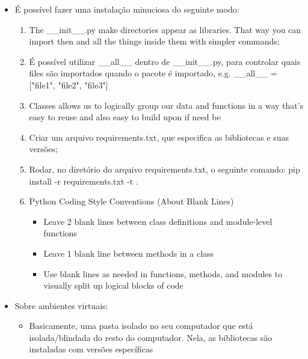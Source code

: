 \begin{itemize}
    \item É possível fazer uma instalação minuciosa do seguinte modo:
    
    \begin{enumerate}
        \item The \_\_init\_\_.py make directories appear as libraries. That way you can import then and all the things inside them with simpler commands; 
        
        \item É possível utilizar \_\_all\_\_ dentro de \_\_init\_\_.py, para controlar quais files são importados quando o pacote é importado, e.g. \_\_all\_\_ = ["file1", "file2", "file3"]
        
        \item Classes allows us to logically group our data and functions in a way that's easy to reuse and also easy to build upon if need be
        
        \item Criar um arquivo requirements.txt, que especifica as bibliotecas e suas versões;
        
        \item Rodar, no diretório do arquivo requirements.txt, o seguinte comando: pip install -r requirements.txt -t .
        
        \item Python Coding Style Conventions (About Blank Lines)
            \begin{itemize}
                \item Leave 2 blank lines between class definitions and module-level functions
                \item Leave 1 blank line between methods in a class
                \item Use blank lines as needed in functions, methods, and modules to visually split up logical blocks of code
            \end{itemize}
        
    \end{enumerate}
    
    \item Sobre ambientes virtuais:
     \begin{itemize}
         \item Basicamente, uma pasta isolado no seu computador que está isolada/blindada do resto do computador. Nela, as bibliotecas são instaladas com versões específicas
     \end{itemize}
\end{itemize}


